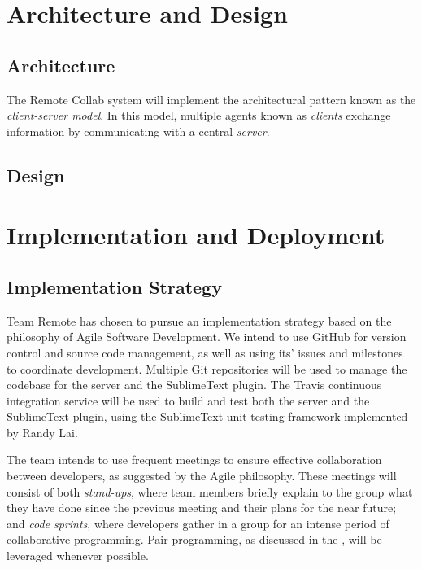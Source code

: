 \documentclass[11pt,english]{article}
\begin{document}
\section{Architecture and Design}
	\subsection{Architecture}
		The Remote Collab system will implement the architectural pattern known as the \textit{client-server model}. In this model, multiple agents known as \textit{clients} exchange information by communicating with a central \textit{server}.

	\subsection{Design}

\section{Implementation and Deployment}
	\subsection{Implementation Strategy}
	\label{sec:implementation}
		Team Remote has chosen to pursue an implementation strategy based on the philosophy of Agile Software Development. We intend to use GitHub\cite{github} for version control and source code management, as well as using its' issues and milestones to coordinate development. Multiple Git repositories will be used to manage the codebase for the server and the SublimeText plugin. The Travis continuous integration service\cite{travis-ci} will be used to build and test both the server and the SublimeText plugin, using the SublimeText unit testing framework\cite{unittest} implemented by Randy Lai.

		The team intends to use frequent meetings to ensure effective collaboration between developers, as suggested by the Agile philosophy. These meetings will consist of both \textit{stand-ups}, where team members briefly explain to the group what they have done since the previous meeting and their plans for the near future; and \textit{code sprints}, where developers gather in a group for an intense period of collaborative programming. Pair programming, as discussed in the , will be leveraged whenever possible.
\end{document}

